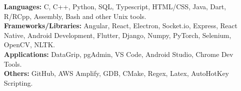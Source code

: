 \vspace{5pt}
{\bf Languages:} C, C++, Python, SQL, Typescript, HTML/CSS, Java, Dart, R/RCpp, Assembly, Bash and other Unix tools.\\
{\bf Frameworks/Libraries:} Angular, React, Electron, Socket.io, Express,  React Native, Android Development, Flutter, Django, Numpy,  PyTorch, Selenium, OpenCV, NLTK.\\
{\bf Applications:} DataGrip, pgAdmin, VS Code, Android Studio, Chrome Dev Tools.\\
{\bf Others:} GitHub, AWS Amplify, GDB, CMake, Regex, Latex, AutoHotKey Scripting.\\
